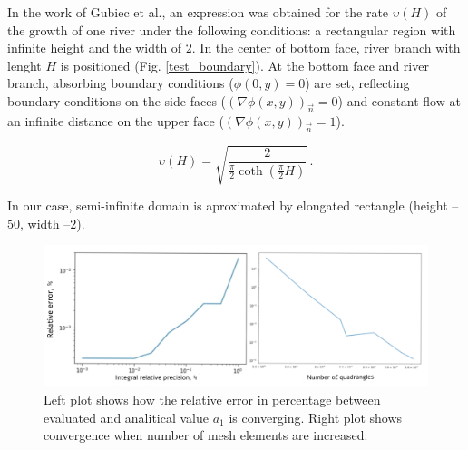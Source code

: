 \documentclass[]{pracamgr}
\begin{document}
    In the work of Gubiec et al.\cite{gubiec2008fingered}, an expression was obtained for the rate $\upsilon(H)$ of the growth of one river under the following conditions: a rectangular region with infinite height and the width of $2$. In the center of bottom face, river branch with lenght $H$ is positioned (Fig. \ref{test_boundary}). At the bottom face and river branch, absorbing boundary conditions ($\phi(0, y) = 0$) are set, reflecting boundary conditions on the side faces ($(\nabla \phi(x, y))_{ \vec{n}} = 0$) and constant flow at an infinite distance on the upper face ($(\nabla \phi(x, y))_{\vec{n}} = 1$).

    \begin{equation}
      \label{velocity_analytical}
      \upsilon(H) = \sqrt{\frac{2}{\frac{\pi}{2}\coth(\frac{\pi}{2}H)}} \,.
    \end{equation}
    
    In our case, semi-infinite domain is aproximated by elongated rectangle (height -- $50$, width --$2$).

    \begin{figure}[H]
      \centering
      \includegraphics[width=1\textwidth]{figs/convergence.png}        
      \caption{Left plot shows how the relative error in percentage between evaluated and analitical value $a_1$ is converging. Right plot shows convergence when number of mesh elements are increased.}
      \label{convergence_new}
    \end{figure}
\end{document}

